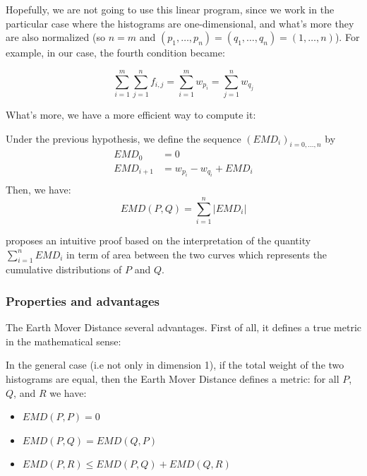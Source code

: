 Hopefully, we are not going to use this linear program, since we work in the particular case where the histograms are one-dimensional, and what's more they are also normalized (so $n = m$ and $(p_1,\dots,p_n) = (q_1,\dots,q_n) = (1,\dots,n)$). For example, in our case, the fourth condition became:

\[
	 \sum_{i=1}^m \sum_{j=1}^n f_{i,j} = \sum_{i=1}^m w_{p_i} = \sum_{j=1}^n w_{q_j}
\]

What's more, we have a more efficient way to compute it:

\begin{theoreme}
	Under the previous hypothesis, we define the sequence $(EMD_i)_{i=0,\dots,n}$ by
\[
	\begin{aligned}
		EMD_0 &= 0\\
		EMD_{i+1} &= w_{p_i} - w_{q_i} + EMD_i\\
	\end{aligned}
\]
	Then, we have: 
\[
	EMD(P,Q) = \sum_{i=1}^n{ \left| EMD_i \right|}
\]
\end{theoreme}

\cite{EMD-proof} proposes an intuitive proof based on the interpretation of the quantity $\sum_{i=1}^n{EMD_i}$ in term of area between the two curves which represents the cumulative distributions of $P$ and $Q$.

\subsubsection{Properties and advantages}

The Earth Mover Distance several advantages. First of all, it defines a true metric in the mathematical sense:

\begin{theoreme}
	In the general case (i.e not only in dimension 1), if the total weight of the two histograms are equal, then the Earth Mover Distance defines a metric: for all $P$, $Q$, and $R$ we have:
	\begin{itemize}
		\item $EMD(P,P) = 0$
		\item $EMD(P,Q) = EMD(Q,P)$
		\item $EMD(P,R) \leq EMD(P,Q) + EMD(Q,R)$
	\end{itemize}
\end{theoreme}

